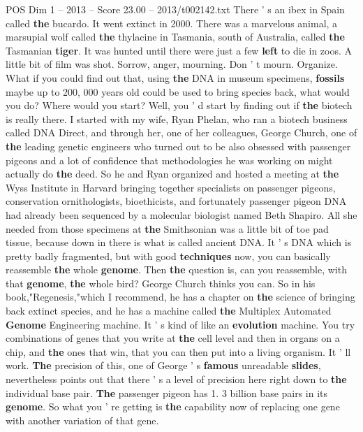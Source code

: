 \begin{textsample}{POS Dim 1 – 2013 – Score 23.00 – 2013/t002142.txt}
There ' s an ibex in Spain called \textbf{the} bucardo.
It went extinct in 2000.
There was a marvelous animal, a marsupial wolf called \textbf{the} thylacine in Tasmania, south of Australia, called \textbf{the} Tasmanian \textbf{tiger}.
It was hunted until there were just a few \textbf{left} to die in zoos.
A little bit of film was shot.
Sorrow, anger, mourning.
Don ' t mourn.
Organize.
What if you could find out that, using \textbf{the} DNA in museum specimens, \textbf{fossils} maybe up to 200, 000 years old could be used to bring species back, what would you do?
Where would you start?
Well, you ' d start by finding out if \textbf{the} biotech is really there.
I started with my wife, Ryan Phelan, who ran a biotech business called DNA Direct, and through her, one of her colleagues, George Church, one of \textbf{the} leading genetic engineers who turned out to be also obsessed with passenger pigeons and a lot of confidence that methodologies he was working on might actually do \textbf{the} deed.
So he and Ryan organized and hosted a meeting at \textbf{the} Wyss Institute in Harvard bringing together specialists on passenger pigeons, conservation ornithologists, bioethicists, and fortunately passenger pigeon DNA had already been sequenced by a molecular biologist named Beth Shapiro.
All she needed from those specimens at \textbf{the} Smithsonian was a little bit of toe pad tissue, because down in there is what is called ancient DNA.
It ' s DNA which is pretty badly fragmented, but with good \textbf{techniques} now, you can basically reassemble \textbf{the} whole \textbf{genome}.
Then \textbf{the} question is, can you reassemble, with that \textbf{genome}, \textbf{the} whole bird?
George Church thinks you can.
So in his book,"Regenesis,"which I recommend, he has a chapter on \textbf{the} science of bringing back extinct species, and he has a machine called \textbf{the} Multiplex Automated \textbf{Genome} Engineering machine.
It ' s kind of like an \textbf{evolution} machine.
You try combinations of genes that you write at \textbf{the} cell level and then in organs on a chip, and \textbf{the} ones that win, that you can then put into a living organism.
It ' ll work. \textbf{The} precision of this, one of George ' s \textbf{famous} unreadable \textbf{slides}, nevertheless points out that there ' s a level of precision here right down to \textbf{the} individual base pair. \textbf{The} passenger pigeon has 1. 3 billion base pairs in its \textbf{genome}.
So what you ' re getting is \textbf{the} capability now of replacing one gene with another variation of that gene.

\end{textsample}
